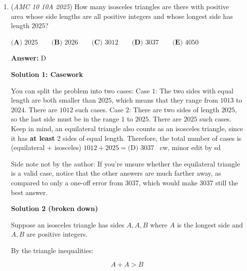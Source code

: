 \begin{enumerate}
Set up the ratios for the initial and the additional mixtures. The ratio of Peanuts:Cashews:Almonds (denoted as P:C:A) would initially be $5x:2x:3x$ for some factor $x$. Then for the second mixture it would be $2x:4x:4x$. If we add these we get 7x:6x:7x. Now we know that the percentage of peanuts is 40\%. But we also know that the number of pounds of peanuts and almonds is the same. $40\%+40\%=80\%$ and so the number of cashews makes up $20\%$ of the mixture. If you divide the factor $x$ by the whole ratio you get $7:6:7$ . These values sum to $20$ and $20\%$ of $20$ is $4$.

 \textbf{Video Solutions} 


	\item (\textit{AMC 10 10A 2025}) How many isosceles triangles are there with positive area whose side lengths are all positive integers and whose longest side has length $2025$?    


 $\textbf{(A) } 2025 \qquad\textbf{(B) } 2026 \qquad\textbf{(C) } 3012 \qquad\textbf{(D) } 3037 \qquad\textbf{(E) } 4050$

 \textbf{Answer: }D



\textbf{Solution 1: Casework}

You can split the problem into two cases:
Case $1$: The two sides with equal length are both smaller than $2025$, which means that they range from $1013$ to $2024$. There are $1012$ such cases.
Case $2$: There are two sides of length $2025$, so the last side must be in the range $1$ to $2025$. There are $2025$ such cases. Keep in mind, an equilateral triangle also counts as an isosceles triangle, since it has \textbf{at least} 2 sides of equal length.
Therefore, the total number of cases is (equilateral + isosceles) $1012 + 2025 = \boxed{\text{(D) }3037}$
~cw, minor edit by sd

 Side note not by the author: If you're unsure whether the equilateral triangle is a valid case, notice that the other answers are much farther away, as compared to only a one-off error from 3037, which would make 3037 still the best answer.

 



\textbf{Solution 2 (broken down)}

Suppose an isosceles triangle has sides $A, A, B$ where $A$ is the longest side and $A, B$ are positive integers.

 By the triangle inequalities:

 
 \[A + A > B\]


\end{enumerate}
